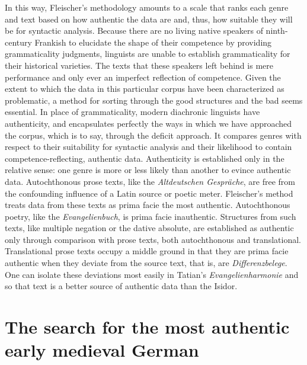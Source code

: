 \begin{sloppypar}
In this way, Fleischer’s methodology amounts to a scale that ranks each genre and text based on how authentic the data are and, thus, how suitable they will be for syntactic analysis. Because there are no living native speakers of ninth-century Frankish to elucidate the shape of their competence by providing grammaticality judgments, linguists are unable to establish grammaticality for their historical varieties. The texts that these speakers left behind is mere performance and only ever an imperfect reflection of competence. Given the extent to which the data in this particular corpus have been characterized as problematic, a method for sorting through the good structures and the bad seems essential. In place of grammaticality, modern diachronic linguists have authenticity, and \citet{Fleischer2006} encapsulates perfectly the ways in which we have approached the corpus, which is to say, through the deficit approach. It compares genres with respect to their suitability for syntactic analysis and their likelihood to contain competence-reflecting, authentic data. Authenticity is established only in the relative sense: one genre is more or less likely than another to evince authentic data. Autochthonous prose texts, like the \textit{Altdeutschen Gespräche}, are free from the confounding influence of a Latin source or poetic meter. Fleischer’s method treats data from these texts as prima facie the most authentic. Autochthonous poetry, like the \textit{Evangelienbuch}, is prima facie inauthentic. Structures from such texts, like multiple negation or the dative absolute, are established as authentic only through comparison with prose texts, both autochthonous and translational. Translational prose texts occupy a middle ground in that they are prima facie authentic when they deviate from the source text, that is, are \textit{Differenzbelege}. One can isolate these deviations most easily in Tatian’s \textit{Evangelienharmonie} and so that text is a better source of authentic data than the Isidor.
\end{sloppypar}

\section{The search for the most authentic early medieval German}\label{sec:2.2}

